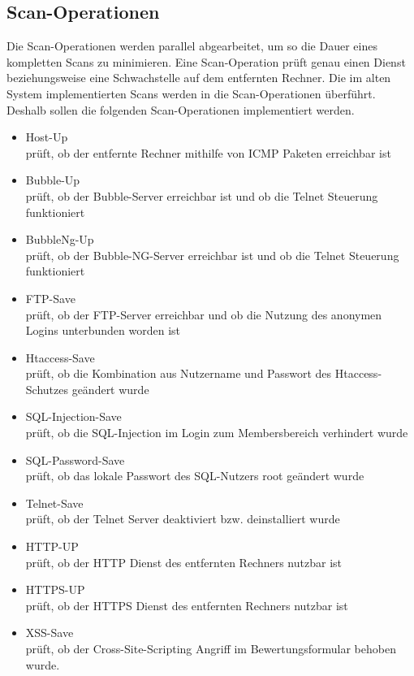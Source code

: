 \subsection{Scan-Operationen}

Die Scan-Operationen werden parallel abgearbeitet, um so die Dauer eines kompletten Scans zu minimieren. Eine Scan-Operation prüft genau einen Dienst beziehungsweise eine Schwachstelle auf dem entfernten Rechner. Die im alten System implementierten Scans werden in die Scan-Operationen überführt. Deshalb sollen die folgenden Scan-Operationen implementiert werden.

\begin{itemize}
	\item Host-Up \\
	prüft, ob der entfernte Rechner mithilfe von ICMP Paketen erreichbar ist
	\item Bubble-Up \\
	prüft, ob der Bubble-Server erreichbar ist und ob die Telnet Steuerung funktioniert
	\item BubbleNg-Up\\
	prüft, ob der Bubble-NG-Server erreichbar ist und ob die Telnet Steuerung funktioniert
	\item FTP-Save\\
	prüft, ob der FTP-Server erreichbar und ob die Nutzung des anonymen Logins unterbunden worden ist
	\item Htaccess-Save\\
	prüft, ob die Kombination aus Nutzername und Passwort des Htaccess-Schutzes geändert wurde
	\item SQL-Injection-Save\\
	prüft, ob die SQL-Injection im Login zum Membersbereich verhindert wurde
	\item SQL-Password-Save\\
	prüft, ob das lokale Passwort des SQL-Nutzers root geändert wurde
	\item Telnet-Save\\
	prüft, ob der Telnet Server deaktiviert bzw. deinstalliert wurde
	\item HTTP-UP\\
	prüft, ob der HTTP Dienst des entfernten Rechners nutzbar ist
	\item HTTPS-UP\\
	prüft, ob der HTTPS Dienst des entfernten Rechners nutzbar ist
	\item XSS-Save\\
	prüft, ob der Cross-Site-Scripting Angriff im Bewertungsformular behoben wurde.
\end{itemize}

